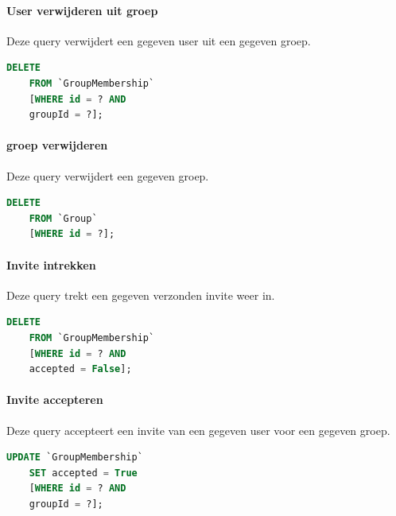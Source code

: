\documentclass[11pt]{article}
\begin{document}
\paragraph{User verwijderen uit groep}

  Deze query verwijdert een gegeven user uit een gegeven groep.

  \begin{framed}
  \begin{lstlisting}[language=sql]
    DELETE 
    FROM `GroupMembership` 
    [WHERE id = ? AND 
    groupId = ?];
  \end{lstlisting}
  \end{framed}
  
\paragraph{groep verwijderen}

  Deze query verwijdert een gegeven groep.

  \begin{framed}
  \begin{lstlisting}[language=sql]
    DELETE 
    FROM `Group` 
    [WHERE id = ?];
  \end{lstlisting}
  \end{framed}  
  
\paragraph{Invite intrekken}

  Deze query trekt een gegeven verzonden invite weer in.

  \begin{framed}
  \begin{lstlisting}[language=sql]
    DELETE 
    FROM `GroupMembership` 
    [WHERE id = ? AND 
    accepted = False];
  \end{lstlisting}
  \end{framed}
  
\paragraph{Invite accepteren}

  Deze query accepteert een invite van een gegeven user voor een gegeven groep.

  \begin{framed}
  \begin{lstlisting}[language=sql]
    UPDATE `GroupMembership`
    SET accepted = True
    [WHERE id = ? AND 
    groupId = ?];
  \end{lstlisting}
  \end{framed}  
\end{document}
